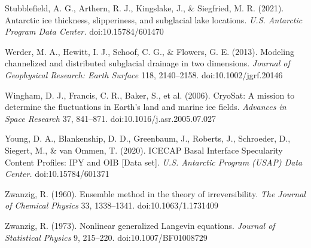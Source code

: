 \documentclass[11pt]{article}
\begin{document}
Stubblefield, A. G., Arthern, R. J., Kingslake, J., \& Siegfried, M. R. (2021). Antarctic ice thickness, slipperiness, and subglacial lake locations. \emph{U.S. Antarctic Program Data Center.} doi:10.15784/601470


Werder, M. A., Hewitt, I. J., Schoof, C. G., \& Flowers, G. E. (2013). Modeling channelized and distributed subglacial drainage in two dimensions. \emph{Journal of Geophysical Research: Earth Surface} 118, 2140–2158. doi:10.1002/jgrf.20146


Wingham, D. J., Francis, C. R., Baker, S., et al. (2006). CryoSat: A mission to determine the fluctuations in Earth's land and marine ice fields. \emph{Advances in Space Research} 37, 841–871. doi:10.1016/j.asr.2005.07.027


Young, D. A., Blankenship, D. D., Greenbaum, J., Roberts, J., Schroeder, D., Siegert, M., \& van Ommen, T. (2020). ICECAP Basal Interface Specularity Content Profiles: IPY and OIB [Data set]. \emph{U.S. Antarctic Program (USAP) Data Center.} doi:10.15784/601371


Zwanzig, R. (1960). Ensemble method in the theory of irreversibility. \emph{The Journal of Chemical Physics} 33, 1338–1341. doi:10.1063/1.1731409


Zwanzig, R. (1973). Nonlinear generalized Langevin equations. \emph{Journal of Statistical Physics} 9, 215–220. doi:10.1007/BF01008729
\end{document}
